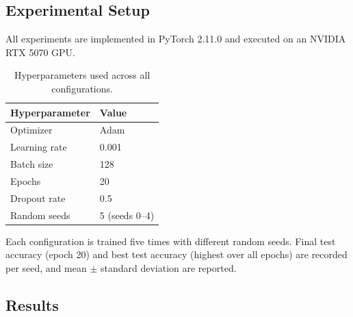 \documentclass[11pt]{article}
\begin{document}
\subsection{Experimental Setup}
All experiments are implemented in PyTorch 2.11.0 and executed on an NVIDIA RTX 5070 GPU.

\begin{table}[H]
  \centering
  \begin{tabular}{ll}
    \toprule
    \textbf{Hyperparameter} & \textbf{Value} \\
    \midrule
    Optimizer    & Adam \\
    Learning rate & 0.001 \\
    Batch size   & 128 \\
    Epochs       & 20 \\
    Dropout rate & 0.5 \\
    Random seeds & 5 (seeds 0--4) \\
    \bottomrule
  \end{tabular}
  \caption{Hyperparameters used across all configurations.}
\end{table}

Each configuration is trained five times with different random seeds. Final test accuracy
(epoch 20) and best test accuracy (highest over all epochs) are recorded per seed, and
mean $\pm$ standard deviation are reported.

\subsection{Results}

\begin{table}[H]
  \centering
  \caption{Test accuracy (mean $\pm$ std over 5 seeds) and final epoch training accuracy.
  Time is total wall-clock time for all 5 seeds.}
\end{table}
\end{document}

